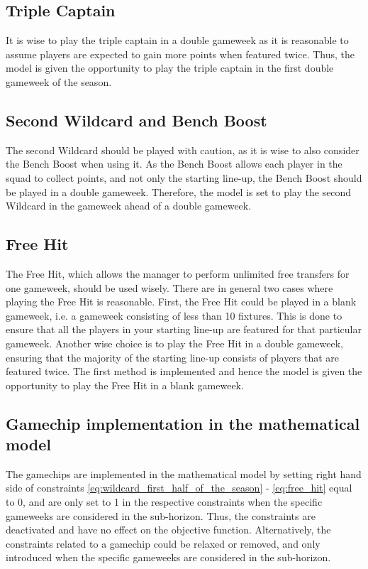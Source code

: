 \subsection{Triple Captain}
It is wise to play the triple captain in a double gameweek as it is reasonable to assume players are expected to gain more points when featured twice. Thus, the model is given the opportunity to play the triple captain in the first double gameweek of the season. 

\subsection{Second Wildcard and Bench Boost}
The second Wildcard should be played with caution, as it is wise to also consider the Bench Boost when using it. As the Bench Boost allows each player in the squad to collect points, and not only the starting line-up, the Bench Boost should be played in a double gameweek. Therefore, the model is set to play the second Wildcard in the gameweek ahead of a double gameweek.

\subsection{Free Hit}
The Free Hit, which allows the manager to perform unlimited free transfers for one gameweek, should be used wisely. There are in general two cases where playing the Free Hit is reasonable. First, the Free Hit could be played in a blank gameweek, i.e. a gameweek consisting of less than 10 fixtures. This is done to ensure that all the players in your starting line-up are featured for that particular gameweek. Another wise choice is to play the Free Hit in a double gameweek, ensuring that the majority of the starting line-up consists of players that are featured twice. The first method is implemented and hence the model is given the opportunity to play the Free Hit in a blank gameweek. 


\subsection{Gamechip implementation in the mathematical model}

The gamechips are implemented in the mathematical model by setting right hand side of constraints \ref{eq:wildcard_first_half_of_the_season} - \ref{eq:free_hit} equal to 0, and are only set to 1 in the respective constraints when the specific gameweeks are considered in the sub-horizon. Thus, the constraints are deactivated and have no effect on the objective function. Alternatively, the constraints related to a gamechip could be relaxed or removed, and only introduced when the specific gameweeks are considered in the sub-horizon.

